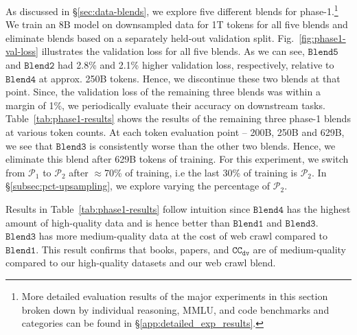 \documentclass[11pt]{article}
\newcommand{\mostofa}[1]{{\color{blue}\bf [MP: #1]}\xspace}
\newcommand{\ccderiv}{$\mathtt{CC_{dv}}$\xspace}
\newcommand{\phaseone}{$\mathcal{P}_1$\xspace}
\newcommand{\phasetwo}{$\mathcal{P}_2$\xspace}
\begin{document}

As discussed in \S\ref{sec:data-blends}, we explore five different blends for phase-1.\footnote{More detailed evaluation results of the major experiments in this section broken down by individual reasoning, MMLU, and code benchmarks and categories can be found in \S\ref{app:detailed_exp_results}.} 
We train an 8B model on downsampled data for 1T tokens for all five blends and eliminate blends based on a separately held-out validation split.
Fig.~\ref{fig:phase1-val-loss} illustrates the validation loss for all five blends.
As we can see, $\mathtt{Blend5}$ and $\mathtt{Blend2}$ had 2.8\% and 2.1\% higher validation loss, respectively, relative to $\mathtt{Blend4}$ at approx. 250B tokens.
Hence, we discontinue these two blends at that point.
Since, the validation loss of the remaining three blends was within a margin of 1\%, we periodically evaluate their accuracy on downstream tasks. 
Table~\ref{tab:phase1-results} shows the results of the remaining three phase-1 blends at various token counts.
At each token evaluation point -- 200B, 250B and 629B, we see that $\mathtt{Blend3}$ is consistently worse than the other two blends.
Hence, we eliminate this blend after 629B tokens of training. 
For this experiment, we switch from \phaseone to \phasetwo after $\approx$70\% of training, i.e the last 30\% of training is \phasetwo. 
In \S\ref{subsec:pct-upsampling}, we explore varying the percentage of \phasetwo.

Results in Table~\ref{tab:phase1-results} follow intuition since $\mathtt{Blend4}$ has the highest amount of high-quality data and is hence better than $\mathtt{Blend1}$ and $\mathtt{Blend3}$. $\mathtt{Blend3}$ has more medium-quality data at the cost of web crawl compared to $\mathtt{Blend1}$. 
This result confirms that books, papers, and \ccderiv are of medium-quality compared to our high-quality datasets and our web crawl blend. 
\end{document}
